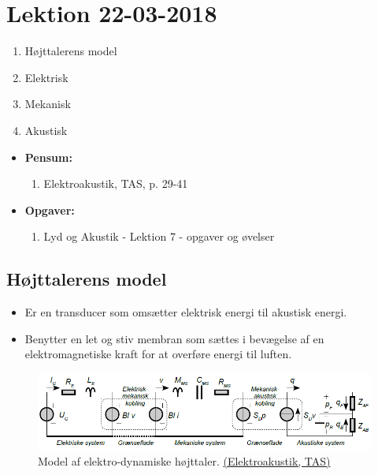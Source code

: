 \section{Lektion 22-03-2018}

\begin{enumerate}
	\item Højttalerens model
	\item Elektrisk
	\item Mekanisk
	\item Akustisk

\end{enumerate}

\begin{mdframed}[style=exampledefault]
	\begin{itemize}
		\item \textbf{Pensum:} 
		\begin{enumerate}
			\item Elektroakustik, TAS,  p. 29-41
		\end{enumerate}
		\item \textbf{Opgaver:} 
		\begin{enumerate}
			\item Lyd og Akustik - Lektion 7 - opgaver og øvelser
		\end{enumerate}
	\end{itemize}
\end{mdframed}

\subsection{Højttalerens model}
\begin{itemize}
	\item Er en transducer som omsætter elektrisk energi til akustisk energi.
	\item Benytter en let og stiv membran som sættes i bevægelse af en elektromagnetiske kraft for at overføre energi til luften.
\end{itemize}

\begin{figure} [H]
	\centering
	\includegraphics[width=\linewidth]{graphics/30.png}
	\caption{Model af elektro-dynamiske højttaler. \href{http://www.torean.dk/artikel/Elektroakustik.pdf}{(Elektroakustik, TAS)}}
	\label{fig:30}
\end{figure}

